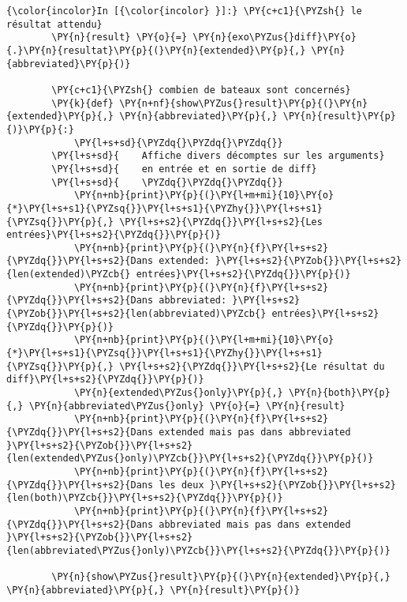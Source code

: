     \begin{Verbatim}[commandchars=\\\{\}]
{\color{incolor}In [{\color{incolor} }]:} \PY{c+c1}{\PYZsh{} le résultat attendu}
        \PY{n}{result} \PY{o}{=} \PY{n}{exo\PYZus{}diff}\PY{o}{.}\PY{n}{resultat}\PY{p}{(}\PY{n}{extended}\PY{p}{,} \PY{n}{abbreviated}\PY{p}{)}
        
        \PY{c+c1}{\PYZsh{} combien de bateaux sont concernés}
        \PY{k}{def} \PY{n+nf}{show\PYZus{}result}\PY{p}{(}\PY{n}{extended}\PY{p}{,} \PY{n}{abbreviated}\PY{p}{,} \PY{n}{result}\PY{p}{)}\PY{p}{:}
            \PY{l+s+sd}{\PYZdq{}\PYZdq{}\PYZdq{}}
        \PY{l+s+sd}{    Affiche divers décomptes sur les arguments}
        \PY{l+s+sd}{    en entrée et en sortie de diff}
        \PY{l+s+sd}{    \PYZdq{}\PYZdq{}\PYZdq{}}
            \PY{n+nb}{print}\PY{p}{(}\PY{l+m+mi}{10}\PY{o}{*}\PY{l+s+s1}{\PYZsq{}}\PY{l+s+s1}{\PYZhy{}}\PY{l+s+s1}{\PYZsq{}}\PY{p}{,} \PY{l+s+s2}{\PYZdq{}}\PY{l+s+s2}{Les entrées}\PY{l+s+s2}{\PYZdq{}}\PY{p}{)}
            \PY{n+nb}{print}\PY{p}{(}\PY{n}{f}\PY{l+s+s2}{\PYZdq{}}\PY{l+s+s2}{Dans extended: }\PY{l+s+s2}{\PYZob{}}\PY{l+s+s2}{len(extended)\PYZcb{} entrées}\PY{l+s+s2}{\PYZdq{}}\PY{p}{)}
            \PY{n+nb}{print}\PY{p}{(}\PY{n}{f}\PY{l+s+s2}{\PYZdq{}}\PY{l+s+s2}{Dans abbreviated: }\PY{l+s+s2}{\PYZob{}}\PY{l+s+s2}{len(abbreviated)\PYZcb{} entrées}\PY{l+s+s2}{\PYZdq{}}\PY{p}{)}
            \PY{n+nb}{print}\PY{p}{(}\PY{l+m+mi}{10}\PY{o}{*}\PY{l+s+s1}{\PYZsq{}}\PY{l+s+s1}{\PYZhy{}}\PY{l+s+s1}{\PYZsq{}}\PY{p}{,} \PY{l+s+s2}{\PYZdq{}}\PY{l+s+s2}{Le résultat du diff}\PY{l+s+s2}{\PYZdq{}}\PY{p}{)}
            \PY{n}{extended\PYZus{}only}\PY{p}{,} \PY{n}{both}\PY{p}{,} \PY{n}{abbreviated\PYZus{}only} \PY{o}{=} \PY{n}{result}
            \PY{n+nb}{print}\PY{p}{(}\PY{n}{f}\PY{l+s+s2}{\PYZdq{}}\PY{l+s+s2}{Dans extended mais pas dans abbreviated }\PY{l+s+s2}{\PYZob{}}\PY{l+s+s2}{len(extended\PYZus{}only)\PYZcb{}}\PY{l+s+s2}{\PYZdq{}}\PY{p}{)}
            \PY{n+nb}{print}\PY{p}{(}\PY{n}{f}\PY{l+s+s2}{\PYZdq{}}\PY{l+s+s2}{Dans les deux }\PY{l+s+s2}{\PYZob{}}\PY{l+s+s2}{len(both)\PYZcb{}}\PY{l+s+s2}{\PYZdq{}}\PY{p}{)}
            \PY{n+nb}{print}\PY{p}{(}\PY{n}{f}\PY{l+s+s2}{\PYZdq{}}\PY{l+s+s2}{Dans abbreviated mais pas dans extended }\PY{l+s+s2}{\PYZob{}}\PY{l+s+s2}{len(abbreviated\PYZus{}only)\PYZcb{}}\PY{l+s+s2}{\PYZdq{}}\PY{p}{)}
        
        \PY{n}{show\PYZus{}result}\PY{p}{(}\PY{n}{extended}\PY{p}{,} \PY{n}{abbreviated}\PY{p}{,} \PY{n}{result}\PY{p}{)}
\end{Verbatim}


